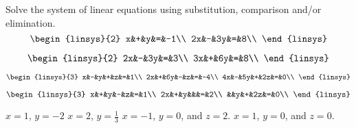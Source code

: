 

\begin{Exercise}[
name={},
title={}, 
difficulty=0,
origin={\cite{GH}}]
Solve the system of linear equations using substitution, comparison and/or elimination.
\Question
\[
\begin{linsys}{2}
x&+&y&=&-1\\
2x&-&3y&=&8\\
\end{linsys}
\]

\Question
\[
\begin{linsys}{2}
2x&-&3y&=&3\\
3x&+&6y&=&8\\
\end{linsys}
\]

\Question
\[
\begin{linsys}{3}
x&-&y&+&z&=&1\\
2x&+&6y&-&z&=&-4\\
4x&-&5y&+&2z&=&0\\
\end{linsys}
\]

\Question
\[
\begin{linsys}{3}
x&+&y&-&z&=&1\\
2x&+&y&&&=&2\\
&&y&+&2z&=&0\\
\end{linsys}
\]

\end{Exercise}

\begin{Answer}
\Question $x=1$, $y=-2$
\Question $x=2$, $y=\frac13$
\Question $x=-1$, $y=0$, and $z=2$.
\Question $x=1$, $y=0$, and $z=0$.
\end{Answer}
